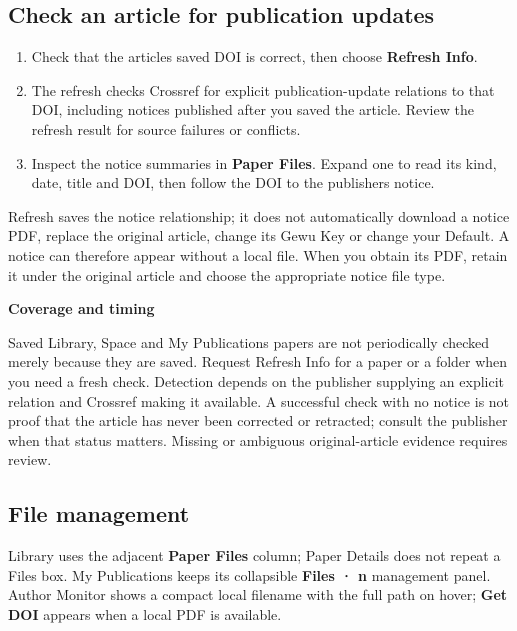\documentclass[10pt,letterpaper,oneside]{scrreprt}
\providecommand{\tightlist}{\setlength{\itemsep}{1pt}\setlength{\parskip}{0pt}}
\renewenvironment{quote}
  {\Needspace{5\baselineskip}\begin{tcolorbox}[enhanced,breakable,colback=GewuPale,colframe=GewuPale,boxrule=0pt,
    borderline west={1.6pt}{0pt}{GewuBlue},arc=1.2mm,left=2.5mm,right=2.5mm,top=1.7mm,bottom=1.7mm,
    before skip=4pt,after skip=5pt,fontupper=\color{GewuInk}\small]}
  {\end{tcolorbox}}
\begin{document}
\subsection{Check an article for publication updates}\label{paper-publication-updates}

\begin{enumerate}
\tightlist
\item
  Check that the article\textquotesingle s saved DOI is correct, then choose \textbf{Refresh Info}.
\item
  The refresh checks Crossref for explicit publication-update relations to that DOI, including notices published after you saved the article. Review the refresh result for source failures or conflicts.
\item
  Inspect the notice summaries in \textbf{Paper Files}. Expand one to read its kind, date, title and DOI, then follow the DOI to the publisher\textquotesingle s notice.
\end{enumerate}

Refresh saves the notice relationship; it does not automatically download a notice PDF, replace the original article, change its Gewu Key or change your Default. A notice can therefore appear without a local file. When you obtain its PDF, retain it under the original article and choose the appropriate notice file type.

\begin{quote}
\textbf{Coverage and timing}

Saved Library, Space and My Publications papers are not periodically checked merely because they are saved. Request Refresh Info for a paper or a folder when you need a fresh check. Detection depends on the publisher supplying an explicit relation and Crossref making it available. A successful check with no notice is not proof that the article has never been corrected or retracted; consult the publisher when that status matters. Missing or ambiguous original-article evidence requires review.
\end{quote}

\subsection{File management}\label{file-management}

Library uses the adjacent \textbf{Paper Files} column; Paper Details does not repeat a Files box. My Publications keeps its collapsible \textbf{Files · n} management panel. Author Monitor shows a compact local filename with the full path on hover; \textbf{Get DOI} appears when a local PDF is available.
\end{document}
